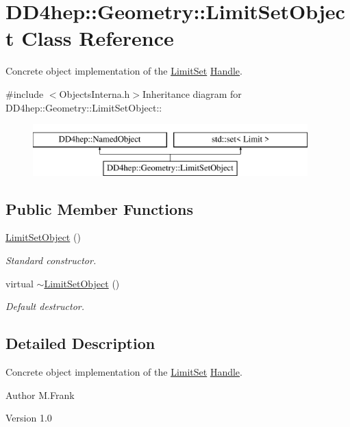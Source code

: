 \hypertarget{class_d_d4hep_1_1_geometry_1_1_limit_set_object}{
\section{DD4hep::Geometry::LimitSetObject Class Reference}
\label{class_d_d4hep_1_1_geometry_1_1_limit_set_object}
}


Concrete object implementation of the \hyperlink{class_d_d4hep_1_1_geometry_1_1_limit_set}{LimitSet} \hyperlink{class_d_d4hep_1_1_handle}{Handle}.  


{\ttfamily \#include $<$ObjectsInterna.h$>$}Inheritance diagram for DD4hep::Geometry::LimitSetObject::\begin{figure}[H]
\begin{center}
\leavevmode
\includegraphics[height=2cm]{class_d_d4hep_1_1_geometry_1_1_limit_set_object}
\end{center}
\end{figure}
\subsection*{Public Member Functions}
\begin{DoxyCompactItemize}
\item 
\hyperlink{class_d_d4hep_1_1_geometry_1_1_limit_set_object_a82ba3444d35470dba78073a03c00a368}{LimitSetObject} ()
\begin{DoxyCompactList}\small\item\em Standard constructor. \item\end{DoxyCompactList}\item 
virtual \hyperlink{class_d_d4hep_1_1_geometry_1_1_limit_set_object_aa437df9d9fb981ac515d47efb876df1a}{$\sim$LimitSetObject} ()
\begin{DoxyCompactList}\small\item\em Default destructor. \item\end{DoxyCompactList}\end{DoxyCompactItemize}


\subsection{Detailed Description}
Concrete object implementation of the \hyperlink{class_d_d4hep_1_1_geometry_1_1_limit_set}{LimitSet} \hyperlink{class_d_d4hep_1_1_handle}{Handle}. \begin{DoxyAuthor}{Author}
M.Frank 
\end{DoxyAuthor}
\begin{DoxyVersion}{Version}
1.0 
\end{DoxyVersion}


